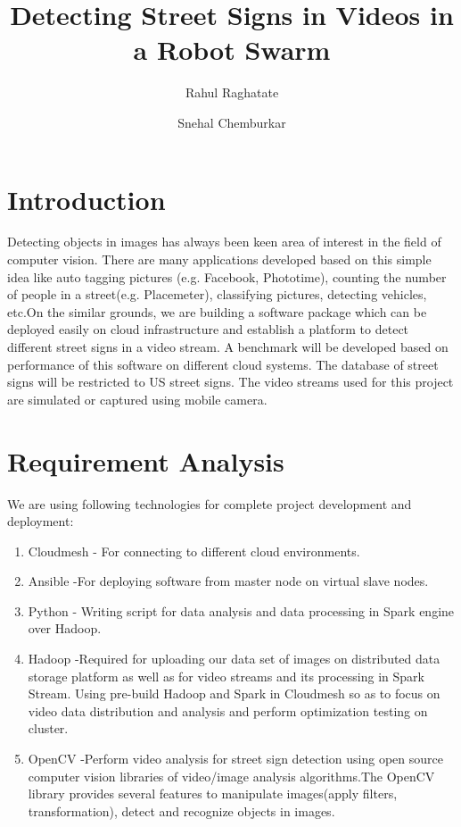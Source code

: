 \documentclass[9pt,twocolumn,twoside]{../../styles/osajnl}
\title{Detecting Street Signs in Videos in a Robot Swarm}
\author[1,*]{Rahul Raghatate}
\author[1]{Snehal Chemburkar}
\affil[1]{School of Informatics and Computing, Bloomington, IN 47408,
  U.S.A.}
\affil[*]{Corresponding authors: rraghata@iu.edu, snehchem@iu.edu}
\begin{document}
\maketitle

\section{Introduction}
Detecting objects in images has always been keen area of interest in
the field of computer vision. There are many applications developed
based on this simple idea like auto tagging pictures (e.g. Facebook,
Phototime), counting the number of people in a
street(e.g. Placemeter), classifying pictures, detecting vehicles,
etc.On the similar grounds, we are building a software package which
can be deployed easily on cloud infrastructure and establish a
platform to detect different street signs in a video stream. A
benchmark will be developed based on performance of this software on
different cloud systems. The database of street signs will be
restricted to US street signs. The video streams used for this project
are simulated or captured using mobile camera.

\section{Requirement Analysis}
We are using following technologies for complete project development
and deployment:
\begin{enumerate}
\item Cloudmesh - For connecting to different cloud environments.
\item Ansible -For deploying software from master node on virtual
  slave nodes.
\item Python - Writing script for data analysis and data processing in
  Spark \cite{www-apache-spark} engine over Hadoop.

\item Hadoop -Required for uploading our data set of images on
  distributed data storage platform as well as for video streams and
  its processing in Spark Stream. Using pre-build Hadoop and Spark in
  Cloudmesh so as to focus on video data distribution and analysis and
  perform optimization testing on cluster.

\item OpenCV \cite{www-opencv} -Perform video analysis for street sign
  detection using open source computer vision libraries of video/image
  analysis algorithms.The OpenCV library provides several features to
  manipulate images(apply filters, transformation), detect and
  recognize objects in images.
\end{enumerate}
\end{document}
